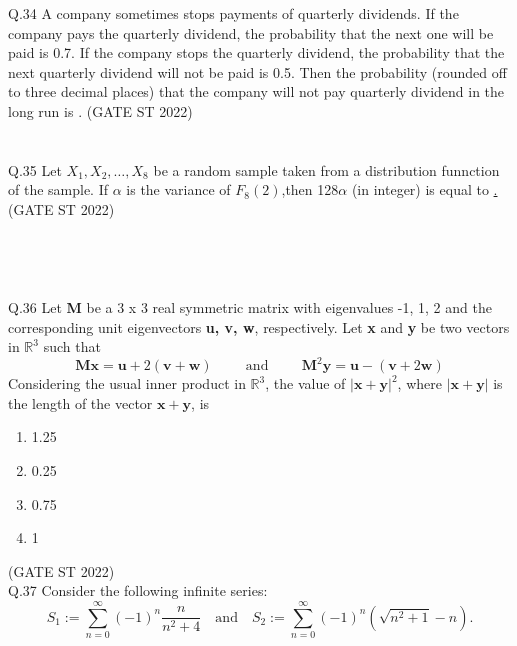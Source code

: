 \documentclass[journal,12pt,onecolumn]{IEEEtran}
\theoremstyle{remark}
\begin{document}
Q.34 A company sometimes stops payments of quarterly dividends. If the company pays the quarterly dividend, the probability that the next one will be paid is 0.7. If the  company stops the quarterly dividend, the probability that the next quarterly dividend will not be paid is 0.5. Then the probability (rounded off to three decimal places) that the company will not pay quarterly dividend in the long run is \underline{\hspace{2cm}}. \hfill (GATE ST 2022)\\
\\
\\
Q.35 Let $X_1,X_2, \dots,X_8$ be a random sample taken from a distribution funnction of the sample. If $\alpha$ is the variance of $F_8(2)$,then 128$\alpha$ (in integer) is equal to \underline{\hspace{2cm}.}\hfill (GATE ST 2022)\\
\\
\pagebreak
\\
\\
\\
Q.36 Let \textbf{M} be a 3 x 3 real symmetric matrix with eigenvalues -1, 1, 2 and the corresponding unit eigenvectors \textbf{u, v, w}, respectively. Let \textbf{x} and \textbf{y} be two vectors in $\mathbb{R}^3$ such that
\[
\mathbf{M} \mathbf{x} = \mathbf{u} + 2(\mathbf{v} + \mathbf{w}) \hspace{1cm} \text{and} \hspace{1cm} \mathbf{M}^2\mathbf{y} = \mathbf{u} -(\mathbf{v} + 2\mathbf{w})
\]
Considering the usual inner product in $\mathbb{R}^3$, the value of ${|\mathbf{x} + \mathbf{y}|}^2$, where $|\mathbf{x} + \mathbf{y}|$ is the length of the vector $\mathbf{x + y}$, is
\begin{multicols}{4}
\begin{enumerate}[label=\Alph*.] 
	\item 1.25
	\item 0.25
	\item 0.75
	\item 1

\end{enumerate}
\end{multicols}
\hfill (GATE ST 2022)\\
	\vspace{2em}
Q.37 Consider the following infinite series:
\[
S_1 := \sum_{n=0}^{\infty} (-1)^n \frac{n}{n^2 + 4} \quad \text{and} \quad 
S_2 := \sum_{n=0}^{\infty} (-1)^n \left(\sqrt{n^2 + 1} - n \right).
\]
\end{document}
